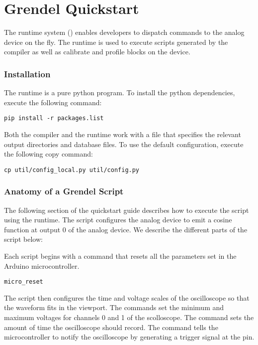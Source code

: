 \chapter{Grendel Quickstart}

The \grendel runtime system () enables developers to dispatch
commands to the \hcdc analog device on the fly. The \grendel runtime is used to
execute scripts generated by the \legno compiler as well as calibrate and profile
blocks on the device. 

\subsection{Installation}

The \grendel runtime is a pure python program. To install the python
dependencies, execute the following command:

\begin{lstlisting}
pip install -r packages.list
\end{lstlisting}

Both the \legno compiler and the \grendel runtime work with a 
file that specifies the relevant output directories and database files. To use
the default configuration, execute the following copy command:

\begin{lstlisting}
cp util/config_local.py util/config.py
\end{lstlisting}

\subsection{Anatomy of a Grendel Script}

The following section of the quickstart guide describes how to execute the
 script using the \grendel runtime. The 
script configures the analog device to emit a cosine function at output 0 of the
analog device. We describe the different parts of the  script below:

Each \grendel script begins with a  command that resets all the
parameters set in the Arduino microcontroller. 

\begin{lstlisting}
micro_reset
\end{lstlisting}

The \grendel script then configures the time and voltage scales of the
oscilloscope so that the waveform fits in the viewport. The 
commands set the minimum and maximum voltages for channels 0 and 1 of the
scolloscope. The  command sets the amount of time the
oscilloscope should record. The  command tells the
microcontroller to notify the oscilloscope by generating a trigger signal at the  pin. 

